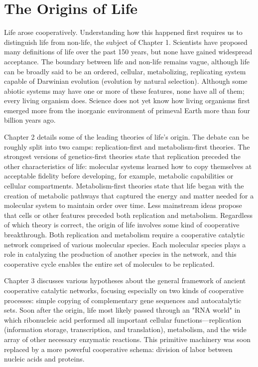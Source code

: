 \documentclass{tufte-book} %
\begin{document}
\chapter{The Origins of Life}\label{origins}

Life arose cooperatively. Understanding how this happened first requires us to distinguish life from non-life, the subject of Chapter 1. Scientists have proposed many definitions of life over the past 150 years, but none have gained widespread acceptance. The boundary between life and non-life remains vague, although life can be broadly said to be an ordered, cellular, metabolizing, replicating system capable of Darwinian evolution (evolution by natural selection). Although some abiotic systems may have one or more of these features, none have all of them; every living organism does. Science does not yet know how living organisms first emerged more from the inorganic environment of primeval Earth more than four billion years ago.

Chapter 2 details some of the leading theories of life's origin. The debate can be roughly split into two camps: replication-first and metabolism-first theories. The strongest versions of genetics-first theories state that replication preceded the other characteristics of life: molecular systems learned how to copy themselves at acceptable fidelity before developing, for example, metabolic capabilities or cellular compartments. Metabolism-first theories state that life began with the creation of metabolic pathways that captured the energy and matter needed for a molecular system to maintain order over time. Less mainstream ideas propose that cells or other features preceded both replication and metabolism. Regardless of which theory is correct, the origin of life involves some kind of cooperative breakthrough. Both replication and metabolism require a cooperative catalytic network comprised of various molecular species. Each molecular species plays a role in catalyzing the production of another species in the network, and this cooperative cycle enables the entire set of molecules to be replicated.

Chapter 3 discusses various hypotheses about the general framework of ancient cooperative catalytic networks, focusing especially on two kinds of cooperative processes: simple copying of complementary gene sequences and autocatalytic sets. Soon after the origin, life most likely passed through an "RNA world" in which ribonucleic acid performed all important cellular functions—replication (information storage, transcription, and translation), metabolism, and the wide array of other necessary enzymatic reactions. This primitive machinery was soon replaced by a more powerful cooperative schema: division of labor between nucleic acids and proteins.
\end{document}
